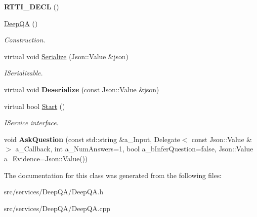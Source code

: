 \begin{DoxyCompactItemize}
\item 
\mbox{\label{class_deep_q_a_af102560fa1f99a45eae69b5743c89f37}} 
{\bfseries R\+T\+T\+I\+\_\+\+D\+E\+CL} ()
\item 
\mbox{\label{class_deep_q_a_ae089062a354214cd8b3885782994c8de}} 
\hyperlink{class_deep_q_a_ae089062a354214cd8b3885782994c8de}{Deep\+QA} ()
\begin{DoxyCompactList}\small\item\em Construction. \end{DoxyCompactList}\item 
\mbox{\label{class_deep_q_a_afa355c4f57b2fa096703721857dafbeb}} 
virtual void \hyperlink{class_deep_q_a_afa355c4f57b2fa096703721857dafbeb}{Serialize} (Json\+::\+Value \&json)
\begin{DoxyCompactList}\small\item\em I\+Serializable. \end{DoxyCompactList}\item 
\mbox{\label{class_deep_q_a_a9d63f6c4ac86c0f5ef5f833ff45b9a87}} 
virtual void {\bfseries Deserialize} (const Json\+::\+Value \&json)
\item 
\mbox{\label{class_deep_q_a_a8382e328037e716bff5043658e1d97e6}} 
virtual bool \hyperlink{class_deep_q_a_a8382e328037e716bff5043658e1d97e6}{Start} ()
\begin{DoxyCompactList}\small\item\em I\+Service interface. \end{DoxyCompactList}\item 
\mbox{\label{class_deep_q_a_ab82a3d90e8f0c1f2431219e235f7c26e}} 
void {\bfseries Ask\+Question} (const std\+::string \&a\+\_\+\+Input, Delegate$<$ const Json\+::\+Value \&$>$ a\+\_\+\+Callback, int a\+\_\+\+Num\+Answers=1, bool a\+\_\+b\+Infer\+Question=false, Json\+::\+Value a\+\_\+\+Evidence=Json\+::\+Value())
\end{DoxyCompactItemize}


The documentation for this class was generated from the following files\+:\begin{DoxyCompactItemize}
\item 
src/services/\+Deep\+Q\+A/Deep\+Q\+A.\+h\item 
src/services/\+Deep\+Q\+A/Deep\+Q\+A.\+cpp\end{DoxyCompactItemize}
